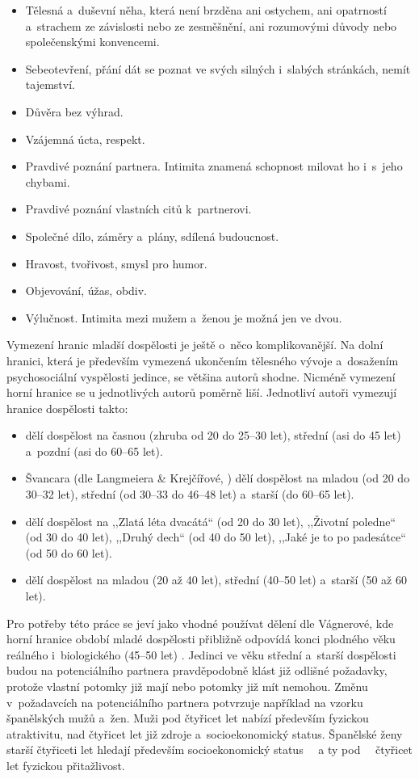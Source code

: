 \documentclass[a4paper, 12pt, notitlepage, oneside, numbers=noenddot]{report}
\begin{document}
\begin{itemize}
\item Tělesná a~duševní něha, která není brzděna ani ostychem, ani
  opatrností a~strachem ze závislosti nebo ze zesměšnění, ani
  rozumovými důvody nebo společenskými konvencemi.
\item Sebeotevření, přání dát se poznat ve svých silných i~slabých
  stránkách, nemít tajemství.
\item Důvěra bez výhrad.
\item Vzájemná úcta, respekt.
\item Pravdivé poznání partnera.  Intimita znamená schopnost milovat
  ho i~s~jeho chybami.
\item Pravdivé poznání vlastních citů k~partnerovi.
\item Společné dílo, záměry a~plány, sdílená budoucnost.
\item Hravost, tvořivost, smysl pro humor.
\item Objevování, úžas, obdiv.
\item Výlučnost.  Intimita mezi mužem a~ženou je možná jen ve dvou.
\end{itemize}

Vymezení hranic mladší dospělosti je ještě o~něco komplikovanější.  Na
dolní hranici, která je především vymezená ukončením tělesného vývoje
a~dosažením psychosociální vyspělosti jedince, se většina autorů
shodne.  Nicméně vymezení horní hranice se u jednotlivých autorů
poměrně liší.  Jednotliví autoři vymezují hranice dospělosti takto:

\begin{itemize}
\item \citet{LangmeierKrejcirova2007} dělí dospělost na časnou (zhruba
  od 20 do 25--30 let), střední (asi do 45 let) a~pozdní (asi do 60--65
  let).
\item Švancara (dle Langmeiera \& Krejčířové,
  \citeyear{LangmeierKrejcirova2007}) dělí dospělost na mladou (od
  20 do 30--32 let), střední (od 30--33 do 46--48 let) a~starší (do 60--65
  let).
\item \citet{Rican2006} dělí dospělost na ,,Zlatá léta dvacátá`` (od 20 do
  30 let), ,,Životní poledne`` (od 30 do 40 let), ,,Druhý dech`` (od
  40 do 50 let), ,,Jaké je to po padesátce`` (od 50 do 60 let).
\item \citet{Vagnerova2007} dělí dospělost na mladou (20 až 40 let),
  střední (40--50 let) a~starší (50 až 60 let).
\end{itemize}
Pro potřeby této práce se jeví jako vhodné používat dělení dle
Vágnerové, kde horní hra\-nice období mladé dospělosti přibližně
odpovídá konci plodného věku reálného \citep{CSU2006,CSU2003}
i~biologického (45--50 let) \citep{Rozsypal2003}.  Jedinci ve věku
střední a~starší dospělosti budou na potenciálního partnera
pravděpodobně klást již odlišné požadavky, protože vlastní potomky již
mají nebo potomky již mít nemohou.  Změnu v~požadavcích na
potenciálního partnera potvrzuje například
\citet{Gil-BurmanPelaezSanchez2002} na vzorku španělských mužů a~žen.
Muži pod čtyřicet let nabízí především fyzickou atraktivitu, nad
čtyřicet let již zdroje a~socioekonomický status.  Španělské ženy
starší čtyřiceti let hledají především socioekonomický status ~~a ty
pod~~ čtyřicet let fyzickou přitažlivost.
\end{document}
